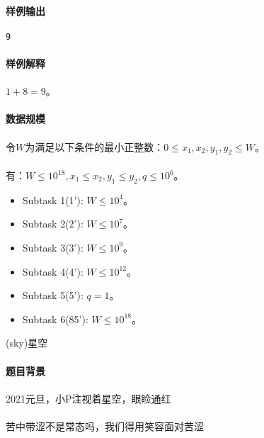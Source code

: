 \documentclass[UTF8]{ctexart}
\begin{document}
\paragraph{样例输出}
\begin{lstlisting}
9
\end{lstlisting}
\paragraph{样例解释}
\paragraph{} $1+8=9$。
\paragraph{数据规模}
\paragraph{} 令$W$为满足以下条件的最小正整数：$0\le x_1,x_2,y_1,y_2\le W$。
\paragraph{} 有：$W\le 10^{18},x_1\le x_2,y_1\le y_2,q\le 10^6$。
\begin{itemize}
	\item Subtask 1(1'): $W\le 10^4$。
	\item Subtask 2(2'): $W\le 10^7$。
	\item Subtask 3(3'): $W\le 10^9$。
	\item Subtask 4(4'): $W\le 10^{12}$。
	\item Subtask 5(5'): $q=1$。
	\item Subtask 6(85'): $W\le 10^{18}$。
\end{itemize}
\clearpage


\begin{center}
	\large{(sky)星空}
\end{center}
\paragraph{题目背景}
\paragraph{}2021元旦，小P注视着星空，眼睑通红
\paragraph{}苦中带涩不是常态吗，我们得用笑容面对苦涩
\end{document}
